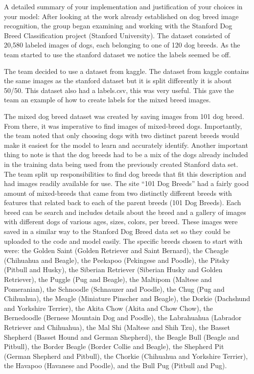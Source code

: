 \documentclass[12pt]{report}
\begin{document}
\indent	\par A detailed summary of your implementation and justification of your choices in your model:
After looking at the work already established on dog breed image recognition, the group began examining and working with the Stanford Dog Breed Classification project (Stanford University).  The dataset consisted of 20,580 labeled images of dogs, each belonging to one of 120 dog breeds. As the team started to use the stanford dataset we notice the labels seemed be off. 
\par The team decided to use a dataset from kaggle. The dataset from kaggle contains the same images as the stanford dataset but it is split differently it is about 50/50. This dataset also had a labels.csv, this was very useful. This gave the team an example of how to create labels for the mixed breed images. 
\par The mixed dog breed dataset was created by saving images from 101 dog breed. From there, it was imperative to find images of mixed-breed dogs. Importantly, the team noted that only choosing dogs with two distinct parent breeds would make it easiest for the model to learn and accurately identify. Another important thing to note is that the dog breeds had to be a mix of the dogs already included in the training data being used from the previously created Stanford data set. The team split up responsibilities to find dog breeds that fit this description and had images readily available for use. The site “101 Dog Breeds” had a fairly good amount of mixed-breeds that came from two distinctly different breeds with features that related back to each of the parent breeds (101 Dog Breeds). Each breed can be search and includes details about the breed and a gallery of images with different dogs of various ages, sizes, colors, per breed. These images were saved in a similar way to the Stanford Dog Breed data set so they could be uploaded to the code and model easily. The specific breeds chosen to start with were: the Golden Saint (Golden Retriever and Saint Bernard), the Cheagle (Chihuahua and Beagle), the Peekapoo (Pekingese and Poodle), the Pitsky (Pitbull and Husky), the Siberian Retriever (Siberian Husky and Golden Retriever), the Puggle (Pug and Beagle), the Maltipom (Maltese and Pomeranian), the Schnoodle (Schnauzer and Poodle), the Chug (Pug and Chihuahua), the Meagle (Miniature Pinscher and Beagle), the Dorkie (Dachshund and Yorkshire Terrier), the Akita Chow (Akita and Chow Chow), the Bernedoodle (Bernese Mountain Dog and Poodle), the Labrahuahua (Labrador Retriever and Chihuahua), the Mal Shi (Maltese and Shih Tzu), the Basset Shepherd (Basset Hound and German Shepherd), the Beagle Bull (Beagle and Pitbull), the Border Beagle (Border Collie and Beagle), the Shepherd Pit (German Shepherd and Pitbull), the Chorkie (Chihuahua and Yorkshire Terrier), the Havapoo (Havanese and Poodle), and the Bull Pug (Pitbull and Pug).		
\end{document}
